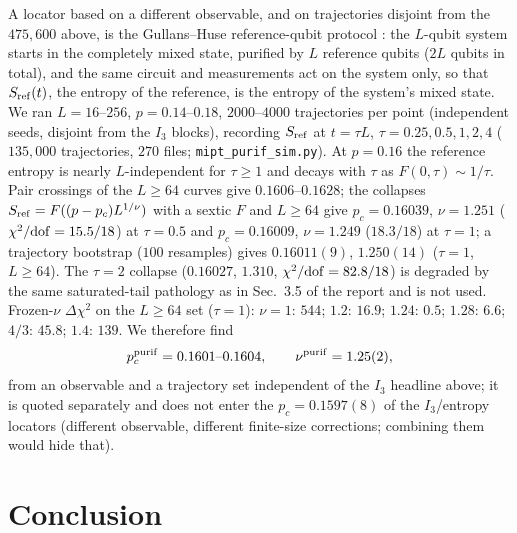 \documentclass[11pt]{article}
\begin{document}
A locator based on a different observable, and on trajectories disjoint from
the $475{,}600$ above, is the Gullans--Huse reference-qubit protocol
\citep{Gullans2020}: the $L$-qubit system starts in the completely mixed
state, purified by $L$ reference qubits ($2L$ qubits in total), and the same
circuit and measurements act on the system only, so that $S_{\rm ref}(t)$,
the entropy of the reference, is the entropy of the system's mixed state.
We ran $L=16$--$256$, $p=0.14$--$0.18$, $2000$--$4000$ trajectories per
point (independent seeds, disjoint from the $I_3$ blocks), recording
$S_{\rm ref}$ at $t=\tau L$, $\tau=0.25,0.5,1,2,4$ ($135{,}000$
trajectories, $270$ files; \texttt{mipt\_purif\_sim.py}).  At $p=0.16$ the
reference entropy is nearly $L$-independent for $\tau\ge1$ and decays with
$\tau$ as $F(0,\tau)\sim1/\tau$.  Pair crossings of the $L\ge64$ curves give
$0.1606$--$0.1628$; the collapses $S_{\rm ref}=F((p-p_c)L^{1/\nu})$ with a
sextic $F$ and $L\ge64$ give $p_c=0.16039$, $\nu=1.251$
($\chi^2/{\rm dof}=15.5/18$) at $\tau=0.5$ and $p_c=0.16009$, $\nu=1.249$
($18.3/18$) at $\tau=1$; a trajectory bootstrap ($100$ resamples) gives
$0.16011(9)$, $1.250(14)$ ($\tau=1$, $L\ge64$).  The $\tau=2$ collapse
($0.16027$, $1.310$, $\chi^2/{\rm dof}=82.8/18$) is degraded by the same
saturated-tail pathology as in Sec.~3.5 of the report and is not used.
Frozen-$\nu$ $\Delta\chi^2$ on the $L\ge64$ set ($\tau=1$): $\nu=1$: $544$;
$1.2$: $16.9$; $1.24$: $0.5$; $1.28$: $6.6$; $4/3$: $45.8$; $1.4$: $139$.
We therefore find
\begin{equation}
  p_c^{\rm purif}=0.1601\text{--}0.1604,\qquad
  \nu^{\rm purif}=1.25(2),
  \label{eq:purif}
\end{equation}
from an observable and a trajectory set independent of the $I_3$ headline
above; it is quoted separately and does not enter the $p_c=0.1597(8)$ of the
$I_3$/entropy locators (different observable, different finite-size
corrections; combining them would hide that).

\section{Conclusion}\label{sec:conclusion}
\end{document}
